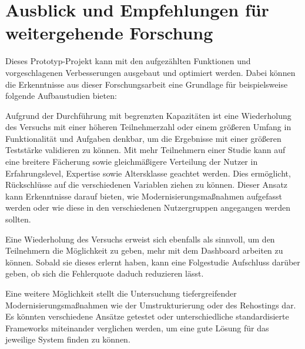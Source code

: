\section{Ausblick und Empfehlungen für weitergehende Forschung}

Dieses Prototyp-Projekt kann mit den aufgezählten Funktionen und vorgeschlagenen Verbesserungen ausgebaut und optimiert werden.
Dabei können die Erkenntnisse aus dieser Forschungsarbeit eine Grundlage für beispielsweise folgende Aufbaustudien bieten:

Aufgrund der Durchführung mit begrenzten Kapazitäten ist eine Wiederholung des Versuchs mit einer höheren Teilnehmerzahl oder  einem größeren Umfang in Funktionalität und Aufgaben denkbar, um die Ergebnisse mit einer größeren Teststärke validieren zu können.
Mit mehr Teilnehmern einer Studie kann auf eine breitere Fächerung sowie gleichmäßigere Verteilung der Nutzer in Erfahrungslevel, Expertise sowie Altersklasse geachtet werden. Dies ermöglicht, Rückschlüsse auf die verschiedenen Variablen ziehen zu können. Dieser Ansatz kann Erkenntnisse darauf bieten, wie Modernisierungsmaßnahmen aufgefasst werden oder wie diese in den verschiedenen Nutzergruppen angegangen werden sollten.

Eine Wiederholung des Versuchs erweist sich ebenfalls als sinnvoll, um den Teilnehmern die Möglichkeit zu geben, mehr mit dem Dash\-board arbeiten zu können. Sobald sie dieses erlernt haben, kann eine Folgestudie Aufschluss darüber geben, ob sich die Fehlerquote daduch reduzieren lässt.

Eine weitere Möglichkeit stellt die Untersuchung tiefergreifender Modernisierungsmaßnahmen wie der Umstrukturierung oder des Rehostings dar. Es könnten verschiedene Ansätze getestet oder unterschiedliche standardisierte Frameworks miteinander verglichen werden, um eine gute Lösung für das jeweilige System finden zu können.

